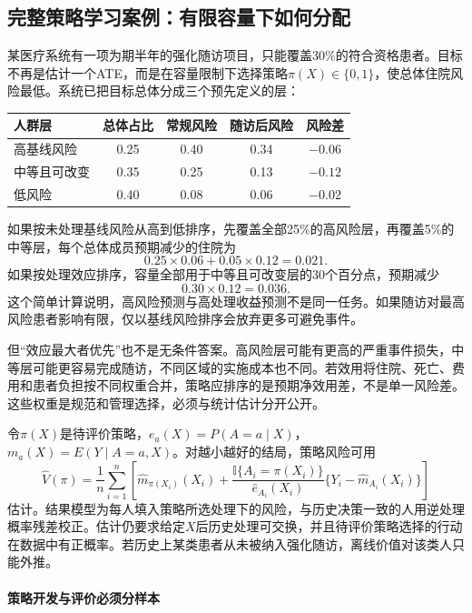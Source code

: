 \subsection{完整策略学习案例：有限容量下如何分配}

某医疗系统有一项为期半年的强化随访项目，只能覆盖30\%的符合资格患者。目标不再是估计一个ATE，而是在容量限制下选择策略$\pi(X)\in\{0,1\}$，使总体住院风险最低。系统已把目标总体分成三个预先定义的层：

\begin{center}
\small
\begin{tabular}{lcccc}
\toprule
人群层 & 总体占比 & 常规风险 & 随访后风险 & 风险差\\
\midrule
高基线风险 & 0.25 & 0.40 & 0.34 & $-0.06$\\
中等且可改变 & 0.35 & 0.25 & 0.13 & $-0.12$\\
低风险 & 0.40 & 0.08 & 0.06 & $-0.02$\\
\bottomrule
\end{tabular}
\end{center}

如果按未处理基线风险从高到低排序，先覆盖全部25\%的高风险层，再覆盖5\%的中等层，每个总体成员预期减少的住院为
\[
0.25\times0.06+0.05\times0.12=0.021.
\]
如果按处理效应排序，容量全部用于中等且可改变层的30个百分点，预期减少
\[
0.30\times0.12=0.036.
\]
这个简单计算说明，高风险预测与高处理收益预测不是同一任务。如果随访对最高风险患者影响有限，仅以基线风险排序会放弃更多可避免事件。

但“效应最大者优先”也不是无条件答案。高风险层可能有更高的严重事件损失，中等层可能更容易完成随访，不同区域的实施成本也不同。若效用将住院、死亡、费用和患者负担按不同权重合并，策略应排序的是预期净效用差，不是单一风险差。这些权重是规范和管理选择，必须与统计估计分开公开。

\begin{workedexample}[离线策略价值的双重稳健估计]
令$\pi(X)$是待评价策略，$e_a(X)=P(A=a\mid X)$，$m_a(X)=E(Y\mid A=a,X)$。对越小越好的结局，策略风险可用
\[
\widehat V(\pi)=\frac1n\sum_{i=1}^n
\left[
\widehat m_{\pi(X_i)}(X_i)+
\frac{\mathbb I\{A_i=\pi(X_i)\}}
{\widehat e_{A_i}(X_i)}
\{Y_i-\widehat m_{A_i}(X_i)\}
\right]
\]
估计。结果模型为每人填入策略所选处理下的风险，与历史决策一致的人用逆处理概率残差校正。估计仍要求给定$X$后历史处理可交换，并且待评价策略选择的行动在数据中有正概率。若历史上某类患者从未被纳入强化随访，离线价值对该类人只能外推。
\end{workedexample}

\paragraph{策略开发与评价必须分样本}

